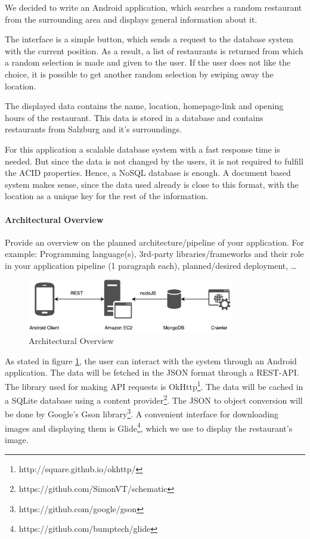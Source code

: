 We decided to write an Android application, which searches a random restaurant from the surrounding area and displays general information about it.

The interface is a simple button, which sends a request to the database system with the current position. As a result, a list of restaurants is returned from which a random selection is made and given to the user. If the user does not like the choice, it is possible to get another random selection by swiping away the location.

The displayed data contains the name, location, homepage-link and opening hours of the restaurant. This data is stored in a database and contains restaurants from Salzburg and it's surroundings. 

For this application a scalable database system with a fast response time is needed. But since the data is not changed by the users, it is not required to fulfill the ACID properties. Hence, a NoSQL database is enough. A document based system makes sense, since the data used already is close to this format, with the location as a unique key for the rest of the information.



\paragraph{Architectural Overview}

Provide an overview on the planned architecture/pipeline of your application.
For example: Programming language(s), 3rd-party libraries/frameworks and their
role in your application pipeline (1 paragraph each), planned/desired
deployment, \ldots

\begin{figure}[H]
	\centering
	\includegraphics[width=0.8\textwidth]{img/Arch}
	\caption{Architectural Overview}
	\label{fig:Arch}
\end{figure}

As stated in figure \ref{fig:Arch}, the user can interact with the system through an Android application. The data will be fetched in the JSON format through a REST-API. The library used for making API requests is OkHttp\footnote{http://square.github.io/okhttp/}. The data will be cached in a SQLite database using a content provider\footnote{https://github.com/SimonVT/schematic}. The JSON to object conversion will be done by Google's Gson library\footnote{https://github.com/google/gson}. A convenient interface for downloading images and displaying them is Glide\footnote{https://github.com/bumptech/glide}, which we use to display the restaurant's image. 

